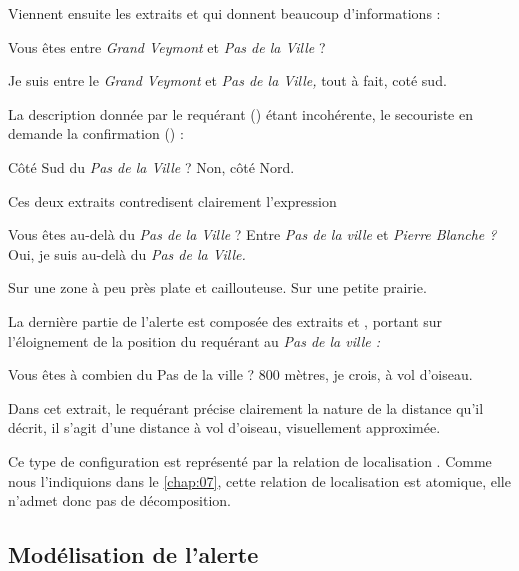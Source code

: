Viennent ensuite les extraits  et  qui donnent beaucoup
d'informations :
%
\begin{dialogue}
  \Sec {} Vous êtes entre \emph{Grand Veymont} et \emph{Pas de
la Ville} ?

  \Req {} Je suis entre le \emph{Grand Veymont}
 et \emph{Pas de la
Ville,} tout à fait,  coté sud.
\end{dialogue}
%

La description donnée par le requérant () étant
incohérente, le secouriste en demande la confirmation () :
%
\begin{dialogue}
  \Sec {} Côté Sud du \emph{Pas de la Ville} ?
%
  \Req {} Non, côté Nord.
\end{dialogue}
%
Ces deux extraits contredisent clairement l'expression 



\begin{dialogue}
  \Sec {} Vous êtes au-delà du \emph{Pas de la Ville} ?
   Entre \emph{Pas de la ville} et \emph{Pierre Blanche ?}
  \Req {} Oui, je suis au-delà du \emph{Pas de la Ville.}
\end{dialogue}



\begin{dialogue}
  \Req {} Sur une zone à peu près plate et
  caillouteuse.  Sur une petite prairie.
\end{dialogue}


La dernière partie de l'alerte est composée des extraits  et
, portant sur l'éloignement de la position du requérant au
\emph{Pas de la ville :}
%
\begin{dialogue}
  \Sec {} Vous êtes à combien du Pas de la ville ?
  \Req {}  800 mètres, je crois, à vol d'oiseau.
\end{dialogue}
%
Dans cet extrait, le requérant précise clairement la nature de la
distance qu'il décrit, il s'agit d'une distance à vol d'oiseau,
visuellement approximée.

Ce type de configuration est représenté par la relation de
localisation
. Comme nous
l'indiquions dans le \autoref{chap:07}, cette relation de localisation
est atomique, elle n'admet donc pas de décomposition.

\subsection{Modélisation de l'alerte}
\label{subsec:9-2-2}


